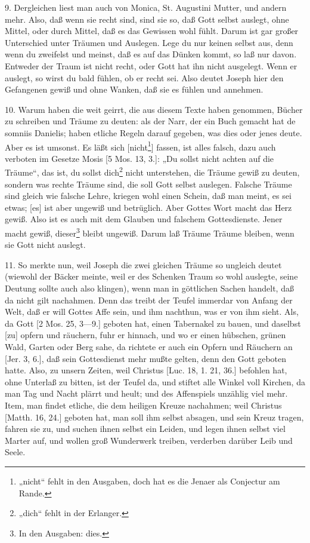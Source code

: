 9. Dergleichen liest man auch von Monica, St. Augustini Mutter, und andern mehr. Also, daß wenn sie recht sind, sind sie so, daß Gott selbst auslegt, ohne Mittel, oder durch Mittel, daß es das Gewissen wohl fühlt. Darum ist gar großer Unterschied unter Träumen und Auslegen. Lege du nur keinen selbst aus, denn wenn du zweifelst und meinst, daß es auf das Dünken kommt, so laß nur davon. Entweder der Traum ist nicht recht, oder Gott hat ihn nicht ausgelegt. Wenn er auslegt, so wirst du bald fühlen, ob er recht sei. Also deutet Joseph hier den Gefangenen gewiß und ohne Wanken, daß sie es fühlen und annehmen.

10. Warum haben die weit geirrt, die aus diesem Texte haben genommen, Bücher zu schreiben und Träume zu deuten: als der Narr, der ein Buch gemacht hat de somniis Danielis; haben etliche Regeln darauf gegeben, was dies oder jenes deute. Aber es ist umsonst. Es läßt sich [nicht\footnote{„nicht“ fehlt in den Ausgaben, doch hat es die Jenaer als Conjectur am Rande.}] fassen, ist alles falsch, dazu auch verboten im Gesetze Mosis [5 Mos. 13, 3.]: „Du sollst nicht achten auf die Träume“, das ist, du sollst dich\footnote{„dich“ fehlt in der Erlanger.} nicht unterstehen, die Träume gewiß zu deuten, sondern was rechte Träume sind, die soll Gott selbst auslegen. Falsche Träume sind gleich wie falsche Lehre, kriegen wohl einen Schein, daß man meint, es sei etwas; [es] ist aber ungewiß und betrüglich. Aber Gottes Wort macht das Herz gewiß. Also ist es auch mit dem Glauben und falschem Gottesdienste. Jener macht gewiß, dieser\footnote{In den Ausgaben: dies.} bleibt ungewiß. Darum laß Träume Träume bleiben, wenn sie Gott nicht auslegt.

11. So merkte nun, weil Joseph die zwei
gleichen Träume so ungleich deutet (wiewohl der Bäcker meinte, weil er des Schenken Traum so wohl auslegte, seine Deutung sollte auch also klingen), wenn man in göttlichen Sachen handelt, daß da nicht gilt nachahmen. Denn das treibt der Teufel immerdar von Anfang der Welt, daß er will Gottes Affe sein, und ihm nachthun, was er von ihm sieht. Als, da Gott [2 Mos. 25, 3—9.] geboten hat, einen Tabernakel zu bauen, und daselbst [zu] opfern und räuchern, fuhr er hinnach, und wo er einen hübschen, grünen Wald, Garten oder Berg sahe, da richtete er auch ein Opfern und Räuchern an [Jer. 3, 6.], daß sein Gottesdienst mehr mußte gelten, denn den Gott geboten hatte. Also, zu unsern Zeiten, weil Christus [Luc. 18, 1. 21, 36.] befohlen hat, ohne Unterlaß zu bitten, ist der Teufel da, und stiftet alle Winkel voll Kirchen, da man Tag und Nacht plärrt und heult; und des Affenspiels unzählig viel mehr. Item, man findet etliche, die dem heiligen Kreuze nachahmen; weil Christus [Matth. 16, 24.] geboten hat, man soll ihm selbst absagen, und sein Kreuz tragen, fahren sie zu, und suchen ihnen selbst ein Leiden, und legen ihnen selbst viel Marter auf, und wollen groß Wunderwerk treiben, verderben darüber Leib und Seele.

